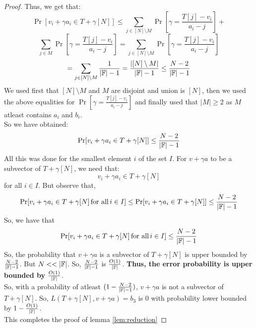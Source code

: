 \begin{proof}
    Thus, we get that:
    $$\Pr[v_i +\gamma a_i \in T+\gamma[N]] \leq
    \sum_{j \in [N]\setminus M} \Pr\left[\gamma = \frac{T[j]-v_i}{a_i-j}\right]+$$
    $$\sum_{j \in M} \Pr\left[\gamma = \frac{T[j]-v_i}{a_i-j}\right]=\sum_{j \in [N]\setminus M} \Pr\left[\gamma = \frac{T[j]-v_i}{a_i-j}\right]$$
    $$=\sum_{j \in [N]\setminus M} \frac{1}{|\mathbb{F}|-1}=\frac{|[N]\setminus M|}{|\mathbb{F}|-1} \leq \frac{N-2}{|\mathbb{F}|-1}$$
    We used first that $[N]\setminus M$ and $M$ are disjoint and union is $[N]$, then we used the above equalities for $\Pr\left[\gamma = \frac{T[j]-v_i}{a_i-j}\right]$ and finally used that $|M| \geq 2$ as $M$ atleast contains $a_i$ and $b_i$.\\
    So we have obtained:
    $$\Pr[v_i +\gamma a_i \in T+\gamma[N]] \leq \frac{N-2}{|\mathbb{F}|-1}$$
    All this was done for the smallest element $i$ of the set $I$.
    For $v+\gamma a$ to be a subvector of $T+\gamma [N]$, we need that:
    $$v_i +\gamma a_i \in T+\gamma[N]$$ for all $i \in I$.
    But observe that,
    $$\Pr[v_i +\gamma a_i \in T+\gamma[N] \, \text{for all} \, i \in I] \leq \Pr[v_i +\gamma a_i \in T+\gamma[N]] \leq \frac{N-2}{|\mathbb{F}|-1}$$
    So, we have that $$\Pr[v_i +\gamma a_i \in T+\gamma[N] \, \text{for all} \,i \in I] \leq \frac{N-2}{|\mathbb{F}|-1}$$
    So, the probability that $v+\gamma a$ is a subvector of $T+\gamma [N]$ is upper bounded by $\frac{N-2}{|\mathbb{F}|-1}$.
    But $N <<|\F|$. So, $\frac{N-2}{|\mathbb{F}|-1}$ is $\frac{O(1)}{|\mathbb{F}|}$. \textbf{Thus, the error probability is upper bounded by $\frac{O(1)}{|\mathbb{F}|}$}.\\
    So, with a probability of atleast $(1-\frac{N-2}{|\mathbb{F}|-1})$, $v+\gamma a$ is not a subvector of $T+\gamma [N]$.
    So, $L(T+\gamma[N], v+\gamma a)=b_3$ is 0 with probability lower bounded by $1-\frac{O(1)}{|\mathbb{F}|}$. \\
    This completes the proof of lemma \ref{lem:reduction}
\end{proof}